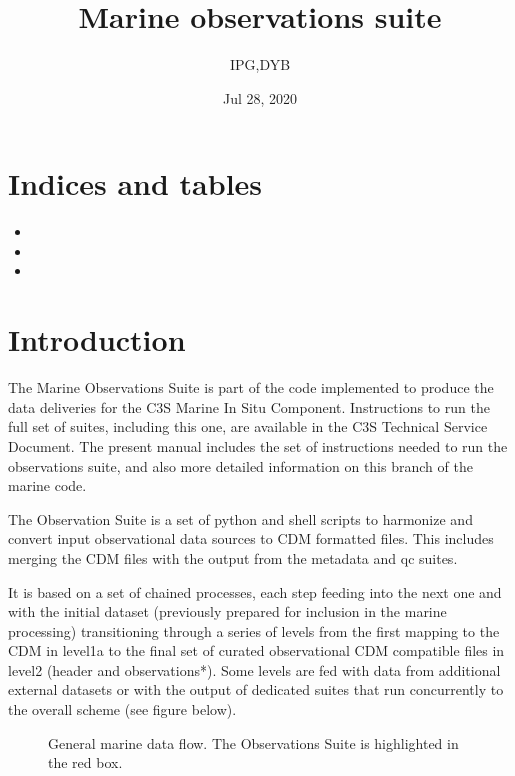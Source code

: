 \documentclass[letterpaper,10pt,english]{sphinxmanual}
\title{Marine observations suite}
\date{Jul 28, 2020}
\author{IPG,DYB}
\let\sphinxpxdimen\pdfpxdimen\else\newdimen\sphinxpxdimen
\begin{document}
\pagestyle{empty}
\sphinxmaketitle
\pagestyle{plain}
\sphinxtableofcontents
\pagestyle{normal}
\label{\detokenize{index::doc}}



\chapter{Indices and tables}
\label{\detokenize{index:indices-and-tables}}\begin{itemize}
\item {} 

\item {} 

\item {} 

\end{itemize}


\chapter{Introduction}
\label{\detokenize{index:introduction}}
The Marine Observations Suite is part of the code implemented to produce the
data deliveries for the C3S Marine In Situ Component. Instructions to run the
full set of suites, including this one, are available in the C3S Technical
Service Document. The present manual includes the set of instructions needed to
run the observations suite, and also more detailed information on this branch of
the marine code.

The Observation Suite is a set of python and shell scripts to harmonize and
convert input observational data sources to CDM formatted files. This includes
merging the CDM files with the output from the metadata and qc suites.

It is based on a set of chained processes, each step feeding into the next one
and with the initial dataset (previously prepared for inclusion in the marine
processing) transitioning through a series of levels from the first mapping to
the CDM in level1a to the final set of curated observational CDM compatible
files in level2 (header and observations\sphinxhyphen{}*). Some levels are fed with data from
additional external datasets or with the output of dedicated suites that run
concurrently to the overall scheme (see figure below).

\begin{figure}[htbp]
\centering
\capstart

\noindent\sphinxincludegraphics[width=600\sphinxpxdimen]{{marine_data_flow}.png}
\caption{General marine data flow. The Observations Suite is highlighted in the red box.}\label{\detokenize{index:id3}}\end{figure}
\end{document}
